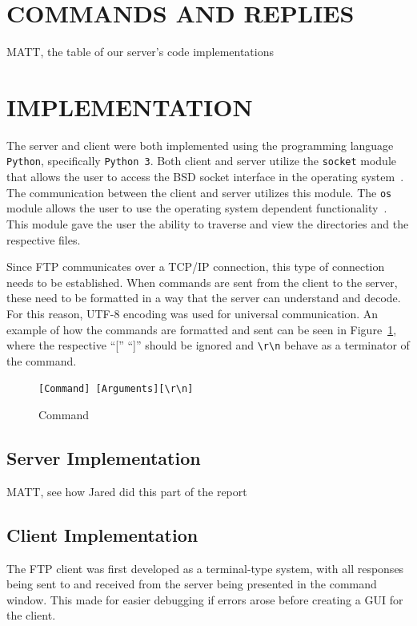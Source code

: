 \documentclass[10pt,twocolumn]{witseiepaper}
\def\code#1{\texttt{#1}}
\begin{document}
%
\section{COMMANDS AND REPLIES}
\label{sec: Commands and Replies}

MATT, the table of our server's code implementations



%
\section{IMPLEMENTATION}
\label{sec: Implementation}
The server and client were both implemented using the programming language \code{Python}, specifically \code{Python 3}. Both client and server utilize the \code{socket} module that allows the user to access the BSD socket interface in the operating system~\cite{socket}. The communication between the client and server utilizes this module. The \code{os} module allows the user to use the operating system dependent functionality~\cite{os}. This module gave the user the ability to traverse and view the directories and the respective files.

Since FTP communicates over a TCP/IP connection, this type of connection needs to be established. When commands are sent from the client to the server, these need to be formatted in a way that the server can understand and decode. For this reason, UTF-8 encoding was used for universal communication. An example of how the commands are formatted and sent can be seen in Figure~\ref{fig: Communication}, where the respective ``['' ``]'' should be ignored and \code{\textbackslash r\textbackslash n} behave as a terminator of the command.

\begin{figure}[h!]
\renewcommand{\thefigure}{\arabic{figure}}
\centering
\code{[Command]\ [Arguments][\textbackslash r\textbackslash n]}
\caption{Command}
\label{fig: Communication}
\end{figure}


\subsection{Server Implementation}
\label{sec: Server Implementation}
MATT, see how Jared did this part of the report


\subsection{Client Implementation}
\label{sec: Client Implementation}
The FTP client was first developed as a terminal-type system, with all responses being sent to and received from the server being presented in the command window. This made for easier debugging if errors arose before creating a GUI for the client.
\end{document}
